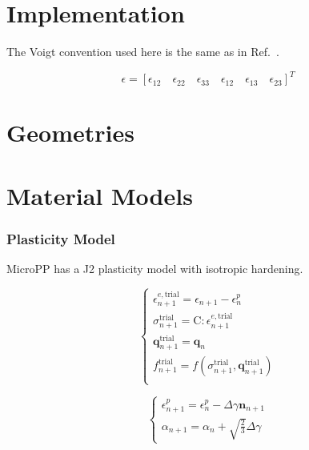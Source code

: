 \documentclass[conference, onecolumn]{IEEEtran}
\begin{document}


\section{Implementation}

The Voigt convention used here is the same as in Ref.~\cite{simo}.

\begin{equation}
\epsilon = \left[\epsilon_{12} \quad \epsilon_{22} \quad \epsilon_{33} \quad \epsilon_{12} \quad \epsilon_{13} \quad \epsilon_{23} \right]^T
\end{equation}

\section{Geometries}

\section{Material Models}

\subsubsection{Plasticity Model}

MicroPP has a J2 plasticity model with isotropic hardening.

\begin {equation}
\left\{
\begin{array}{ll}
\epsilon_{n+1}^{e,\text{trial}} = \epsilon_{n+1} - \epsilon_{n}^{p} \\[5pt]
\sigma_{n+1}^{\text{trial}} = \mathrm{C} : \epsilon_{n+1}^{e,\text{trial}} \\[5pt]
\mathbf{q}_{n+1}^{\text{trial}} = \mathbf{q}_{n} \\[5pt]
f_{n+1}^{\text{trial}} = f (\sigma_{n+1}^{\text{trial}}, \mathbf{q}_{n+1}^{\text{trial}})\\
\end{array}
\right.
\end {equation}

\begin {equation}
\left\{
\begin{array}{ll}
\epsilon_{n+1}^{p} = \epsilon_{n}^{p} - \Delta \gamma  \mathbf{n}_{n+1} \\[5pt]
\alpha_{n+1} = \alpha_{n} + \sqrt{\frac{2}{3}} \Delta \gamma
\end{array}
\right.
\end {equation}
\end{document}
